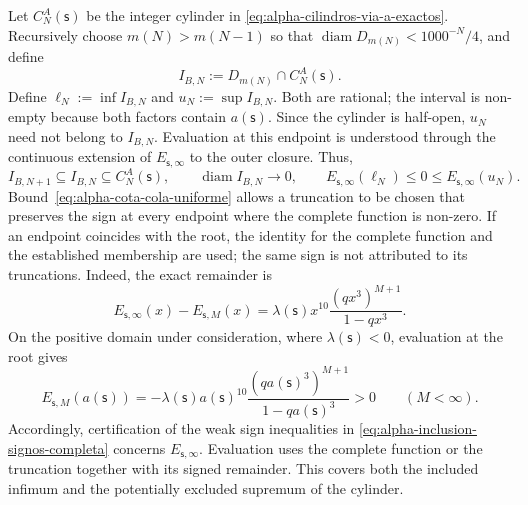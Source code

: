 Let \(C_N^A(\mathsf s)\) be the integer cylinder in
\eqref{eq:alpha-cilindros-via-a-exactos}. Recursively choose
\(m(N)>m(N-1)\) so that
\(\operatorname{diam}D_{m(N)}<1000^{-N}/4\), and define
\begin{equation}
I_{B,N}:=D_{m(N)}\cap C_N^A(\mathsf s).
 \label{eq:alpha-intervalos-b-completos}
\end{equation}
Define
\(\ell_N:=\inf I_{B,N}\) and \(u_N:=\sup I_{B,N}\). Both are rational;
the interval is non-empty because both factors contain
\(a(\mathsf s)\). Since the cylinder is half-open, \(u_N\) need not
belong to \(I_{B,N}\). Evaluation at this endpoint is understood through
the continuous extension of \(E_{\mathsf s,\infty}\) to the outer closure. Thus,
\begin{equation}
 I_{B,N+1}\subseteq I_{B,N}\subseteq C_N^A(\mathsf s),
 \qquad \operatorname{diam}I_{B,N}\longrightarrow0,
 \qquad E_{\mathsf s,\infty}(\ell_N)\leq0\leq
 E_{\mathsf s,\infty}(u_N).
 \label{eq:alpha-inclusion-signos-completa}
\end{equation}
Bound~\eqref{eq:alpha-cota-cola-uniforme} allows a truncation to be chosen
that preserves the sign at every endpoint where the complete function is
non-zero. If an endpoint coincides with the root, the identity for the complete
function and the established membership are used; the same sign is not
attributed to its truncations. Indeed, the exact remainder is
\[
 E_{\mathsf s,\infty}(x)-E_{\mathsf s,M}(x)
 =\lambda(\mathsf s)x^{10}
   \frac{(qx^3)^{M+1}}{1-qx^3}.
\]
On the positive domain under consideration, where \(\lambda(\mathsf s)<0\),
evaluation at the root gives
\[
 E_{\mathsf s,M}(a(\mathsf s))
 =-\lambda(\mathsf s)a(\mathsf s)^{10}
   \frac{(qa(\mathsf s)^3)^{M+1}}{1-qa(\mathsf s)^3}>0
 \qquad(M<\infty).
\]
Accordingly, certification of the weak sign inequalities in
\eqref{eq:alpha-inclusion-signos-completa} concerns
\(E_{\mathsf s,\infty}\). Evaluation uses the complete function or the
truncation together with its signed remainder. This covers both the included
infimum and the potentially excluded supremum of the cylinder.

